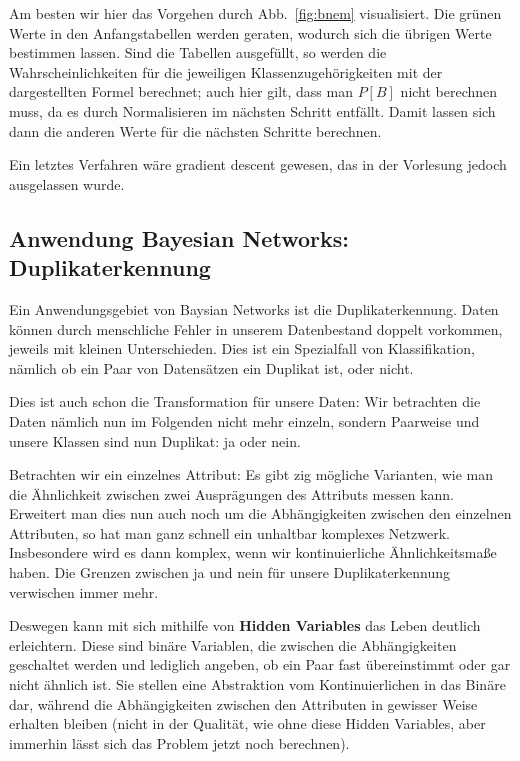 Am besten wir hier das Vorgehen durch Abb.~\ref{fig:bnem} visualisiert.
Die grünen Werte in den Anfangstabellen werden geraten, wodurch sich die übrigen Werte bestimmen lassen. Sind die Tabellen ausgefüllt,
so werden die Wahrscheinlichkeiten für die jeweiligen 
Klassenzugehörigkeiten mit der dargestellten Formel berechnet; auch hier
gilt, dass man \(P[B]\) nicht berechnen muss, da es durch Normalisieren
im nächsten Schritt entfällt. Damit lassen sich dann die anderen Werte
für die nächsten Schritte berechnen.

Ein letztes Verfahren wäre gradient descent gewesen, das in der Vorlesung
jedoch ausgelassen wurde.

\subsection{Anwendung Bayesian Networks: Duplikaterkennung}
Ein Anwendungsgebiet von Baysian Networks ist die Duplikaterkennung.
Daten können durch menschliche Fehler in unserem Datenbestand
doppelt vorkommen, jeweils mit kleinen Unterschieden. Dies ist ein
Spezialfall von Klassifikation, nämlich ob ein Paar von Datensätzen ein
Duplikat ist, oder nicht. 

Dies ist auch schon die Transformation für unsere Daten: Wir 
betrachten die Daten nämlich nun im Folgenden nicht mehr
einzeln, sondern Paarweise und unsere Klassen sind nun 
Duplikat: ja oder nein.

Betrachten wir ein einzelnes Attribut: Es gibt zig mögliche Varianten,
wie man die Ähnlichkeit zwischen zwei Ausprägungen des Attributs
messen kann. Erweitert man dies nun auch noch um die Abhängigkeiten
zwischen den einzelnen Attributen, so hat man ganz schnell ein 
unhaltbar komplexes Netzwerk. Insbesondere wird es dann komplex,
wenn wir kontinuierliche Ähnlichkeitsmaße haben. Die Grenzen zwischen
ja und nein für unsere Duplikaterkennung verwischen immer mehr.

Deswegen kann mit sich mithilfe von \textbf{Hidden Variables} das
Leben deutlich erleichtern. Diese sind binäre Variablen, die zwischen
die Abhängigkeiten geschaltet werden und lediglich angeben,
ob ein Paar fast übereinstimmt oder gar nicht ähnlich ist. Sie stellen eine
Abstraktion vom Kontinuierlichen in das Binäre dar, während die
Abhängigkeiten zwischen den Attributen in gewisser Weise erhalten
bleiben (nicht in der Qualität, wie ohne diese Hidden Variables, aber
immerhin lässt sich das Problem jetzt noch berechnen).